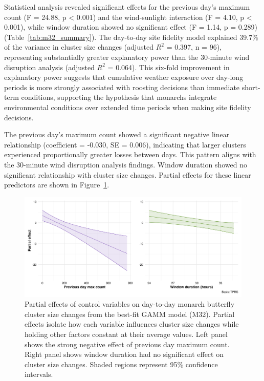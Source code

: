 Statistical analysis revealed significant effects for the previous day's maximum count (F = 24.88, p < 0.001) and the wind-sunlight interaction (F = 4.10, p < 0.001), while window duration showed no significant effect (F = 1.14, p = 0.289) (Table~\ref{tab:m32_summary}). The day-to-day site fidelity model explained 39.7\% of the variance in cluster size changes (adjusted $R^2$ = 0.397, n = 96), representing substantially greater explanatory power than the 30-minute wind disruption analysis (adjusted $R^2$ = 0.064). This six-fold improvement in explanatory power suggests that cumulative weather exposure over day-long periods is more strongly associated with roosting decisions than immediate short-term conditions, supporting the hypothesis that monarchs integrate environmental conditions over extended time periods when making site fidelity decisions.



The previous day's maximum count showed a significant negative linear relationship (coefficient = -0.030, SE = 0.006), indicating that larger clusters experienced proportionally greater losses between days. This pattern aligns with the 30-minute wind disruption analysis findings. Window duration showed no significant relationship with cluster size changes. Partial effects for these linear predictors are shown in Figure~\ref{fig:partial_effects_sunset}.

\begin{figure}[htbp]
    \centering
    \includegraphics[width=\textwidth]{supplemental/results/sunset/figures/partial_effects_best_1x2.png}
    \caption[Partial effects of control variables (M32)]{Partial effects of control variables on day-to-day monarch butterfly cluster size changes from the best-fit GAMM model (M32). Partial effects isolate how each variable influences cluster size changes while holding other factors constant at their average values. Left panel shows the strong negative effect of previous day maximum count. Right panel shows window duration had no significant effect on cluster size changes. Shaded regions represent 95\% confidence intervals.}
    \label{fig:partial_effects_sunset}
\end{figure}

